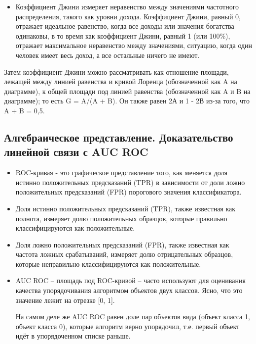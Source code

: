 \documentclass{article}
\begin{document}
\begin{itemize}
    \item Коэффициент Джини измеряет неравенство между значениями частотного распределения, такого как уровни дохода. Коэффициент Джини, равный 0, отражает идеальное равенство, когда все доходы или значения богатства одинаковы, в то время как коэффициент Джини, равный 1 (или 100\%), отражает максимальное неравенство между значениями, ситуацию, когда один человек имеет весь доход, а все остальные ничего не имеют.
\end{itemize}

Затем коэффициент Джини можно рассматривать как отношение площади, лежащей между линией равенства и кривой Лоренца (обозначенной как A на диаграмме), к общей площади под линией равенства (обозначенной как A и B на диаграмме); то есть G = A/(A + B). Он также равен 2А и 1 - 2В из-за того, что A + B = 0,5.

\subsection*{Алгебраическое представление. Доказательство линейной связи с AUC ROC}

\begin{itemize}
        \item ROC-кривая - это графическое представление того, как меняется доля истинно положительных предсказаний (TPR) в зависимости от доли ложно положительных предсказаний (FPR) порогового значения классификатора.

        \item Доля истинно положительных предсказаний (TPR), также известная как полнота, измеряет долю положительных образцов, которые правильно классифицируются как положительные.

        \item Доля ложно положительных предсказаний (FPR), также известная как частота ложных срабатываний, измеряет долю отрицательных образцов, которые неправильно классифицируются как положительные.

        \item AUC ROC – площадь под ROC-кривой – часто используют для оценивания качества упорядочивания алгоритмом объектов двух классов. Ясно, что это значение лежит на отрезке [0, 1]. 

        На самом деле же AUC ROC равен доле пар объектов вида (объект класса 1, объект класса 0), которые алгоритм верно упорядочил, т.е. первый объект идёт в упорядоченном списке раньше.
    \end{itemize}
\end{document}
